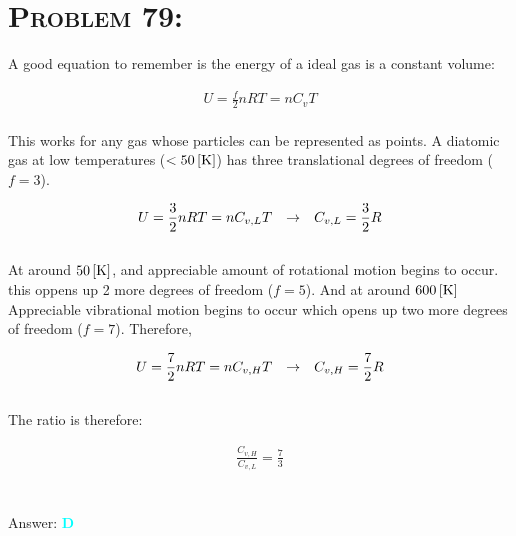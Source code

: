 \documentclass{article}
\begin{document}

\section{\textsc{Problem 79:}} A good equation to remember is the energy of a ideal gas is a constant volume:

\begin{gather}
U = \frac{f}{2} n R T = n C_{v} T
\end{gather}
\\
This works for any gas whose particles can be represented as points. A diatomic gas at low temperatures ($<\unit[50]{[K]}$) has three translational degrees of freedom ($f=3$).

\begin{gather}
U = \frac{3}{2} n R T = n C_{v,L} T \hspace{.1in} \rightarrow \hspace{.1in} C_{v,L} = \frac{3}{2} R\nonumber
\end{gather}
\\
At around $\unit[50]{[K]}$, and appreciable amount of rotational motion begins to occur. this oppens up 2 more degrees of freedom ($f=5$). And at around $\unit[600]{[K]}$ Appreciable vibrational motion begins to occur which opens up two more degrees of freedom ($f=7$). Therefore, 

\begin{gather}
U = \frac{7}{2} n R T = n C_{v,H} T \hspace{.1in} \rightarrow \hspace{.1in} C_{v,H} = \frac{7}{2} R\nonumber
\end{gather}
\\
The ratio is therefore:

\begin{gather}
\boxed{\frac  { C_{v,H}  }  {  C_{v,L} }  =  \frac{7}{3} }  \nonumber
\end{gather}
\\\\
Answer: \textbf{\textcolor{cyan}D}\\

\end{document}
